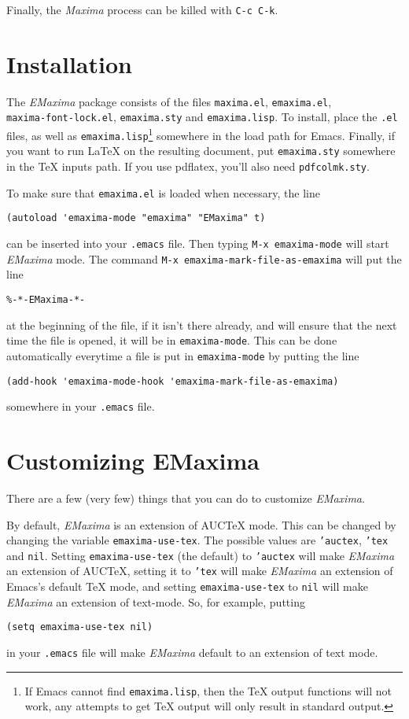 \documentclass{article}
\newcommand{\emx}{\textsl{\sffamily EMaxima}}
\newcommand{\mx}{\textsl{\sffamily Maxima}}
\begin{document}
Finally, the \mx{} process can be killed with \texttt{C-c C-k}.

\newpage
\appendix

\section{Installation}

\noindent
The \emx{} package consists of the files \texttt{maxima.el},
\texttt{emaxima.el},\\
\texttt{maxima-font-lock.el}, \texttt{emaxima.sty} and \texttt{emaxima.lisp}.
To install, place the \texttt{.el} files, as well as
\texttt{emaxima.lisp}\footnote{If Emacs cannot find
  \texttt{emaxima.lisp}, then the \TeX{} output functions will not
  work, any attempts to get \TeX{} output will only result in standard
  output.} 
somewhere in the load path for Emacs.
Finally, if you want to run \LaTeX{} on the resulting document, put
\texttt{emaxima.sty} somewhere in the \TeX{} inputs path.  If you use
pdflatex, you'll also need \texttt{pdfcolmk.sty}.

To make sure that \texttt{emaxima.el} is loaded when necessary, the line
\begin{verbatim}
(autoload 'emaxima-mode "emaxima" "EMaxima" t)
\end{verbatim}
\noindent
can be inserted into your \texttt{.emacs} file.  Then typing
\texttt{M-x emaxima-mode} will start \emx{} mode.  The command 
\texttt{M-x emaxima-mark-file-as-emaxima} will put the line
\begin{verbatim}
%-*-EMaxima-*-
\end{verbatim}
\noindent
at the beginning of the file, if it isn't there already, and will ensure
that the next time the file is opened, it will be in \texttt{emaxima-mode}.  
This can be done automatically everytime a file is put in
\texttt{emaxima-mode} by putting the line
\begin{verbatim}
(add-hook 'emaxima-mode-hook 'emaxima-mark-file-as-emaxima)
\end{verbatim}
\noindent
somewhere in your \texttt{.emacs} file.

\section{Customizing EMaxima}

\noindent
There are a few (very few) things that you can do to customize \emx{}.  

By default, \emx{} is an extension of AUC\TeX{} mode.  This can be
changed by changing the variable \texttt{emaxima-use-tex}.  The possible
values are \texttt{'auctex}, \texttt{'tex} and \texttt{nil}.  Setting
\texttt{emaxima-use-tex} (the default) to \texttt{'auctex} will make \emx{}
an extension of AUC\TeX{}, setting it to \texttt{'tex} will make \emx{} an
extension of Emacs's default \TeX{} mode, and setting
\texttt{emaxima-use-tex} to \texttt{nil} will make \emx{} an extension of
text-mode.  So, for example, putting 
\begin{verbatim}
(setq emaxima-use-tex nil)
\end{verbatim}
\noindent
in your \texttt{.emacs} file will make \emx{} default to an extension of
text mode. 
\end{document}
